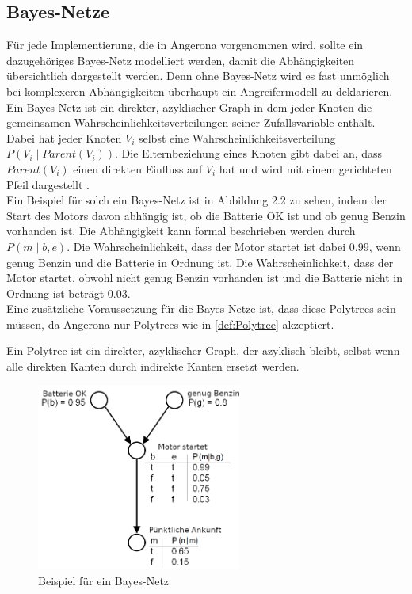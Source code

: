 \documentclass[german,version-2020-11]{uzl-thesis}
\begin{document}
\subsection{Bayes-Netze}
Für jede Implementierung, die in Angerona vorgenommen wird, sollte ein dazugehöriges Bayes-Netz modelliert werden, damit die Abhängigkeiten übersichtlich dargestellt werden. Denn ohne Bayes-Netz  wird es fast unmöglich bei komplexeren Abhängigkeiten überhaupt ein Angreifermodell zu deklarieren.  \\
Ein Bayes-Netz ist ein direkter, azyklischer Graph in dem jeder Knoten die gemeinsamen Wahrscheinlichkeitsverteilungen seiner Zufallsvariable enthält. Dabei hat jeder Knoten $V_i$ selbst eine Wahrscheinlichkeitsverteilung $P(V_i \mid Parent(V_i) )$. Die Elternbeziehung eines Knoten gibt dabei an, dass $Parent(V_i) $ einen direkten Einfluss auf $V_i$ hat und wird  mit einem gerichteten Pfeil dargestellt \cite{3}.\\  Ein Beispiel für solch ein Bayes-Netz ist in Abbildung 2.2 zu sehen, indem der Start des Motors davon abhängig ist, ob die Batterie OK ist und ob genug Benzin vorhanden ist. Die Abhängigkeit kann formal beschrieben werden durch $P(m \mid b,e)$. Die Wahrscheinlichkeit, dass der Motor startet ist dabei $0.99$, wenn genug Benzin und die Batterie in Ordnung ist. Die Wahrscheinlichkeit, dass der Motor startet, obwohl nicht genug Benzin vorhanden ist und die Batterie nicht in Ordnung ist beträgt $0.03$. \\
Eine zusätzliche Voraussetzung für die Bayes-Netze ist, dass diese Polytrees sein müssen, da Angerona nur Polytrees wie in \cref{def:Polytree} akzeptiert.
 \begin{definition}[Polytree]\label{def:Polytree}
	Ein Polytree ist ein direkter, azyklischer Graph, der azyklisch bleibt, selbst wenn alle direkten Kanten durch indirekte Kanten ersetzt werden.
\end{definition}
\begin{figure}[ht]
	\centering
	\includegraphics[width=0.6\textwidth]{bayes-netz-bsp.PNG}
	\caption{Beispiel für ein Bayes-Netz \cite{10}}
	\label{fig}
\end{figure}
\end{document}
